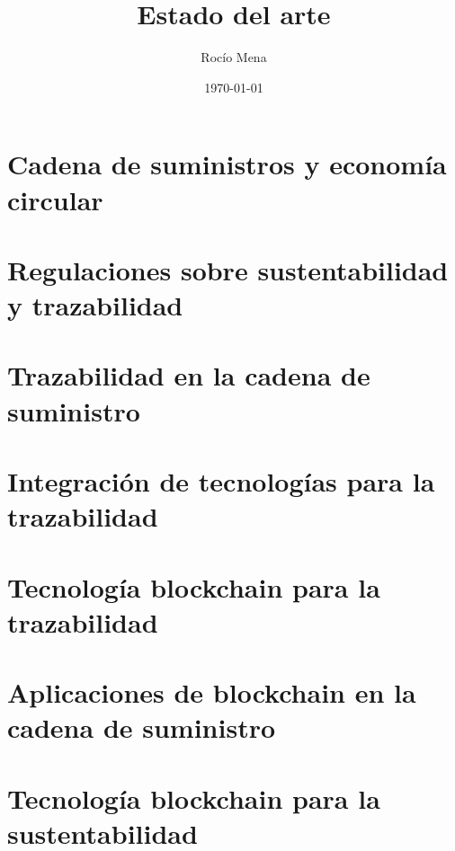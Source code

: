 \documentclass[main.tex]{subfiles}
\title{Estado del arte}
\author{Rocío Mena}
\date{\today}
\begin{document}
\maketitle

\section{Cadena de suministros y economía circular}

\section{Regulaciones sobre sustentabilidad y trazabilidad}

\section{Trazabilidad en la cadena de suministro}

\section{Integración de tecnologías para la trazabilidad}

\section{Tecnología blockchain para la trazabilidad}

\section{Aplicaciones de blockchain en la cadena de suministro}

\section{Tecnología blockchain para la sustentabilidad}
\end{document}
